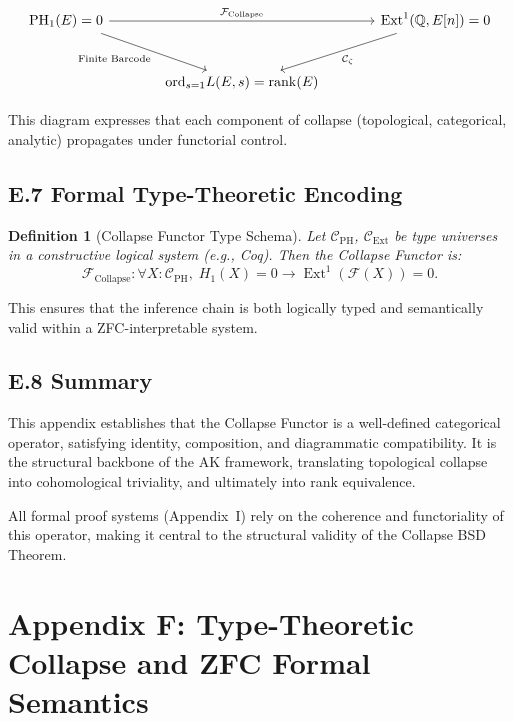 \documentclass[11pt]{article}
\newtheorem{definition}[theorem]{Definition}
\DeclareMathOperator{\Ext}{Ext}
\DeclareMathOperator{\PH}{PH}
\newcommand{\QQ}{\mathbb{Q}}
\begin{document}
\[
\begin{tikzcd}[row sep=large, column sep=large]
\PH_1(E) = 0 \arrow[rr, "\mathcal{F}_{\mathrm{Collapse}}"] \arrow[dr, swap, "\text{Finite Barcode}"]
& & \Ext^1(\QQ,E[n]) = 0 \arrow[dl, "\mathcal{C}_\zeta"] \\
& \mathrm{ord}_{s=1} L(E,s) = \mathrm{rank}(E) &
\end{tikzcd}
\]

This diagram expresses that each component of collapse (topological, categorical, analytic) propagates under functorial control.

\subsection*{E.7 Formal Type-Theoretic Encoding}

\begin{definition}[Collapse Functor Type Schema]
Let $\mathcal{C}_{\mathrm{PH}}$, $\mathcal{C}_{\mathrm{Ext}}$ be type universes in a constructive logical system (e.g., Coq).  
Then the Collapse Functor is:
\[
\mathcal{F}_{\mathrm{Collapse}} : \forall X : \mathcal{C}_{\mathrm{PH}},\; H_1(X) = 0 \to \Ext^1(\mathcal{F}(X)) = 0.
\]
\end{definition}

This ensures that the inference chain is both logically typed and semantically valid within a ZFC-interpretable system.

\subsection*{E.8 Summary}

This appendix establishes that the Collapse Functor is a well-defined categorical operator, satisfying identity, composition, and diagrammatic compatibility.  
It is the structural backbone of the AK framework, translating topological collapse into cohomological triviality, and ultimately into rank equivalence.

All formal proof systems (Appendix~I) rely on the coherence and functoriality of this operator, making it central to the structural validity of the Collapse BSD Theorem.




\section*{Appendix F: Type-Theoretic Collapse and ZFC Formal Semantics}
\end{document}
